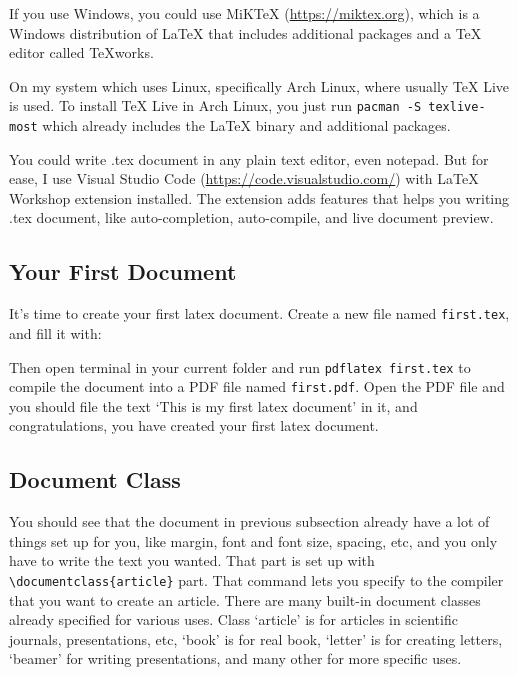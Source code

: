 \documentclass[conference]{IEEEtran}
\begin{document}
    If you use Windows, you could use MiKTeX (\url{https://miktex.org}),
    which is a Windows distribution of
    LaTeX that includes additional packages and a TeX editor called TeXworks.

    On my system which uses Linux, specifically Arch Linux, where usually 
    TeX Live is used.
    To install TeX Live in Arch Linux, you just run \texttt{pacman -S texlive-most}
    which already includes the LaTeX binary and additional packages.

    You could write .tex document in any plain text editor, even notepad.
    But for ease, I use Visual Studio Code (\url{https://code.visualstudio.com/})
    with LaTeX Workshop extension installed.
    The extension adds features that helps you writing .tex document, like
    auto-completion, auto-compile, and live document preview.

\subsection{Your First Document}
    It's time to create your first latex document.
    Create a new file named \texttt{first.tex}, and fill it with:

    

    Then open terminal in your current folder and run \texttt{pdflatex first.tex}
    to compile the document into a PDF file named \texttt{first.pdf}.
    Open the PDF file and you should file the text `This is my first latex document'
    in it, and congratulations, you have created your first latex document.

\subsection{Document Class}
    You should see that the document in previous subsection already have a lot
    of things set up for you,
    like margin, font and font size, spacing, etc, and you only have to write the
    text you wanted.
    That part is set up with \texttt{\textbackslash documentclass\{article\}} part.
    That command lets you specify to the compiler that you want to create an 
    article. There are many built-in document classes already specified for
    various uses. Class `article' is for articles in scientific journals,
    presentations, etc, `book' is for real book, `letter' is for creating letters,
    `beamer' for writing presentations, and many other for more specific uses.
\end{document}
